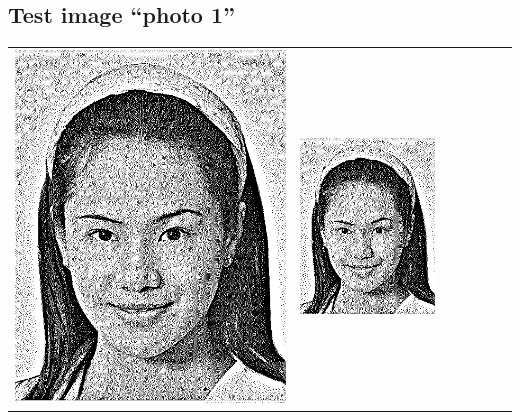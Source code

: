 \subsection{Test image ``photo 1''}
\begin{tabular}{lllllll}
	\includegraphics{Ediphoto-1-1.png} &
	\includegraphics{Ediphoto-1-2.png} &

\end{tabular}
